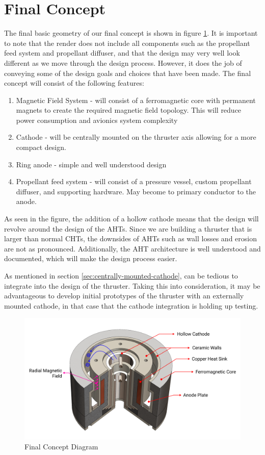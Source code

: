 \section{Final Concept}

The final basic geometry of our final concept is shown in figure \ref{fig:final_concept}. It is important to note that the render does not include all components such as the propellant feed system and propellant diffuser, and that the design may very well look different as we move through the design process. However, it does the job of conveying some of the design goals and choices that have been made. The final concept will consist of the following features:

\begin{enumerate}
    \item Magnetic Field System - will consist of a ferromagnetic core with permanent magnets to create the required magnetic field topology. This will reduce power consumption and avionics system complexity
    \item Cathode - will be centrally mounted on the thruster axis allowing for a more compact design.
    \item Ring anode - simple and well understood design
    \item Propellant feed system - will consist of a pressure vessel, custom propellant diffuser, and supporting hardware. May become to primary conductor to the anode.
\end{enumerate}

As seen in the figure, the addition of a hollow cathode means that the design will revolve around the design of the \ac{AHT}s. Since we are building a thruster that is larger than normal \ac{CHT}s, the downsides of \ac{AHT}s such as wall losses and erosion are not as pronounced. Additionally, the \ac{AHT} architecture is well understood and documented, which will make the design process easier.

As mentioned in section \ref{sec:centrally-mounted-cathode}, can be tedious to integrate into the design of the thruster. Taking this into consideration, it may be advantageous to develop initial prototypes of the thruster with an externally mounted cathode, in that case that the cathode integration is holding up testing. 

\begin{figure}[H]
    \centering
    \includegraphics[width=1.0\textwidth]{images/Concepts/final concept.png}
    \captionsetup{justification=centering}
    \caption{Final Concept Diagram}
    \label{fig:final_concept}
\end{figure}